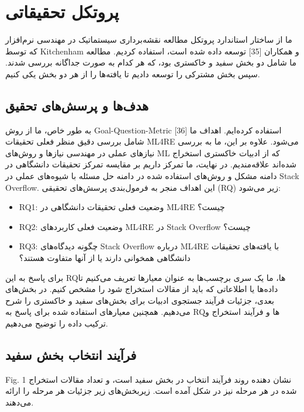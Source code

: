 \documentclass[a4paper,10pt]{article}
\begin{document}

    \section{پروتکل تحقیقاتی}
    
        ما از ساختار استاندارد پروتکل مطالعه نقشه‌برداری سیستماتیک در مهندسی نرم‌افزار که توسط Kitchenham و همکاران [35] توسعه داده شده است، استفاده کردیم. مطالعه ما شامل دو بخش سفید و خاکستری بود، که هر کدام به صورت جداگانه بررسی شدند. سپس بخش مشترکی را توسعه دادیم تا یافته‌ها را از هر دو بخش یکی کنیم.

        \subsection{هدف‌ها و پرسش‌های تحقیق}

            به طور خاص، ما از روش Goal-Question-Metric [36] استفاده کرده‌ایم. اهداف ما شامل بررسی دقیق منظر فعلی تحقیقات ML4RE می‌شود. علاوه بر این، ما به بررسی نیازهای عملی در مهندسی نیازها و روش‌های ML که از ادبیات خاکستری استخراج شده‌اند علاقه‌مندیم. در نهایت، ما تمرکز داریم بر مقایسه تمرکز تحقیقات دانشگاهی در دامنه مشکل و روش‌های استفاده شده در دامنه حل مسئله با شیوه‌های عملی در Stack Overflow. این اهداف منجر به فرمول‌بندی پرسش‌های تحقیقی (RQ) زیر می‌شود:

            \begin{itemize}
            \item RQ1: وضعیت فعلی تحقیقات دانشگاهی در ML4RE چیست؟
            \item RQ2: وضعیت فعلی کاربردهای ML4RE در Stack Overflow چیست؟
            \item RQ3: چگونه دیدگاه‌های Stack Overflow درباره ML4RE با یافته‌های تحقیقات دانشگاهی همخوانی دارند یا از آنها متفاوت هستند؟
            \end{itemize}

            برای پاسخ به این RQها، ما یک سری برچسب‌ها به عنوان معیارها تعریف می‌کنیم تا داده‌ها یا اطلاعاتی که باید از مقالات استخراج شود را مشخص کنیم. در بخش‌های بعدی، جزئیات فرآیند جستجوی ادبیات برای بخش‌های سفید و خاکستری را شرح می‌دهیم. همچنین معیارهای استفاده شده برای پاسخ به RQها و فرآیند استخراج و ترکیب داده را توضیح می‌دهیم.

        \subsection{فرآیند انتخاب بخش سفید}

            Fig. 1 نشان دهنده روند فرآیند انتخاب در بخش سفید است، و تعداد مقالات استخراج شده در هر مرحله نیز در شکل آمده است. زیربخش‌های زیر جزئیات هر مرحله را ارائه می‌دهند.
\end{document}
